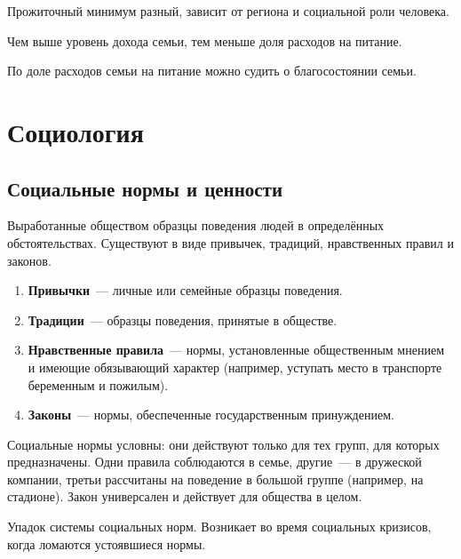 \documentclass[12pt]{article}
\begin{document}
	\begin{note}
		Прожиточный минимум разный, зависит от региона и социальной роли человека.
	\end{note}

	\begin{statement}
		Чем выше уровень дохода семьи, тем меньше доля расходов на питание.

		По доле расходов семьи на питание можно судить о благосостоянии семьи.
	\end{statement}

	\section{Социология}

	\subsection{Социальные нормы и ценности}

	\begin{definition}
		Выработанные обществом образцы поведения людей в определённых обстоятельствах. Существуют в виде привычек, традиций, нравственных правил и законов.
	\end{definition}

	\begin{enumerate}
		\item \textbf{Привычки}~--- личные или семейные образцы поведения.
		\item \textbf{Традиции}~--- образцы поведения, принятые в обществе.
		\item \textbf{Нравственные правила}~--- нормы, установленные общественным мнением и имеющие обязывающий характер (например, уступать место в транспорте беременным и пожилым).
		\item \textbf{Законы}~--- нормы, обеспеченные государственным принуждением.
	\end{enumerate}

	\begin{note}
		Социальные нормы условны: они действуют только для тех групп, для которых предназначены. Одни правила соблюдаются в семье, другие~--- в дружеской компании, третьи рассчитаны на поведение в большой группе (например, на стадионе). Закон универсален и действует для общества в целом.
	\end{note}

	\begin{definition}[Аномия]
		Упадок системы социальных норм. Возникает во время социальных кризисов, когда ломаются устоявшиеся нормы.
	\end{definition}
\end{document}
